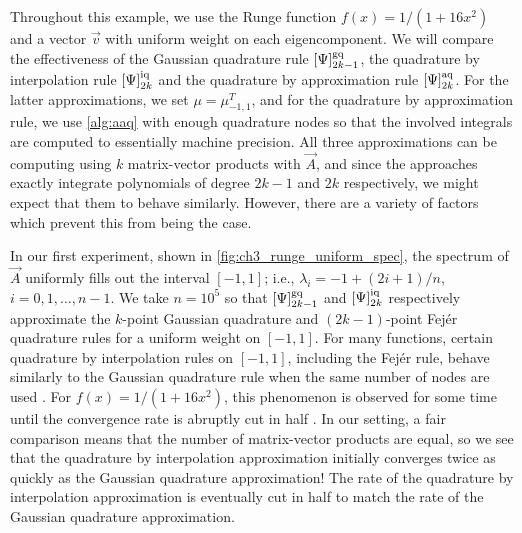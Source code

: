 Throughout this example, we use the Runge function \( f(x) = 1/(1+16x^2) \) and a vector \( \vec{v} \) with uniform weight on each eigencomponent.
We will compare the effectiveness of the Gaussian quadrature rule \( \qq[g]{\Psi}{2k-1} \), the quadrature by interpolation rule \( \qq[i]{\Psi}{2k} \) and the quadrature by approximation rule \( \qq[a]{\Psi}{2k} \). 
For the latter approximations, we set \( \mu = \mu_{-1,1}^T \), and for the quadrature by approximation rule, we use \cref{alg:aaq} with enough quadrature nodes so that the involved integrals are computed to essentially machine precision.
All three approximations can be computing using \( k \) matrix-vector products with \( \vec{A} \), and since the approaches exactly integrate polynomials of degree \( 2k-1 \) and \( 2k \) respectively, we might expect that them to behave similarly.
However, there are a variety of factors which prevent this from being the case.

In our first experiment, shown in \cref{fig:ch3_runge_uniform_spec}, the spectrum of \( \vec{A} \) uniformly fills out the interval \( [-1,1] \); i.e., \( \lambda_i = -1+(2i+1)/n \), \( i=0,1,\ldots, n-1 \).
We take \( n=10^5 \) so that \( \qq[g]{\Psi}{2k-1} \) and \( \qq[i]{\Psi}{2k} \) respectively approximate the \( k \)-point Gaussian quadrature and \( (2k-1) \)-point Fej\'{e}r quadrature rules for a uniform weight on \( [-1,1] \).
For many functions, certain quadrature by interpolation rules on \( [-1,1] \), including the Fej\'{e}r rule, behave similarly to the Gaussian quadrature rule when the same number of nodes are used \cite{trefethen_08}.
For \( f(x) = 1/(1+16x^2) \), this phenomenon is observed for some time until the convergence rate is abruptly cut in half \cite{weideman_trefethen_07}.
In our setting, a fair comparison means that the number of matrix-vector products are equal, so we see that the quadrature by interpolation approximation initially converges twice as quickly as the Gaussian quadrature approximation!
The rate of the quadrature by interpolation approximation is eventually cut in half to match the rate of the Gaussian quadrature approximation. 

